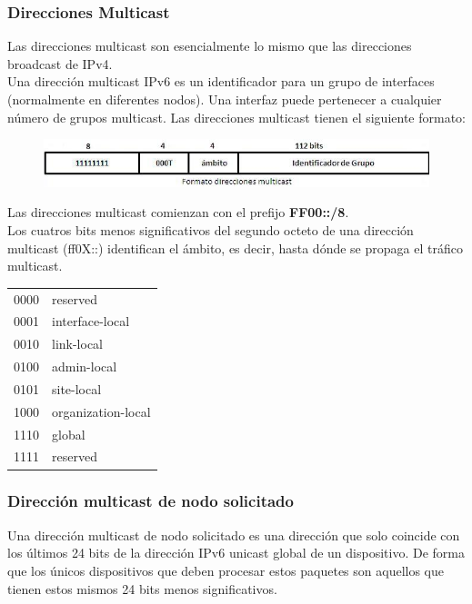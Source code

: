 \begin{onepage}


\subsubsection{Direcciones Multicast}
Las direcciones multicast son esencialmente lo mismo que las direcciones broadcast de IPv4.\\

Una dirección multicast IPv6 es un identificador para un grupo de interfaces (normalmente en diferentes nodos). Una interfaz puede pertenecer a cualquier número de grupos multicast. Las direcciones multicast tienen el siguiente formato:

\begin{figure}[H]
    \centering \includegraphics[width=\textwidth]{img/IPv6_MULTI.jpg}
\end{figure}

Las direcciones multicast comienzan con el prefijo \textbf{FF00::/8}.\\

Los cuatros bits menos significativos del segundo octeto de una dirección multicast (ff0X::) identifican el ámbito, es decir, hasta dónde se propaga el tráfico multicast.

\begin{table}[H]\centering\begin{tabular}{ll}
0000 & reserved           \\ 
0001 & interface-local    \\ 
0010 & link-local         \\ 
0100 & admin-local        \\ 
0101 & site-local         \\ 
1000 & organization-local \\ 
1110 & global             \\ 
1111 & reserved           \\ 
\end{tabular}\end{table}
\subsubsection{Dirección multicast de nodo solicitado}
Una dirección multicast de nodo solicitado es una dirección que solo coincide con los últimos 24 bits de la dirección IPv6 unicast global de un dispositivo. De forma que los únicos dispositivos que deben procesar estos paquetes son aquellos que tienen estos mismos 24 bits menos significativos.


\end{onepage}
